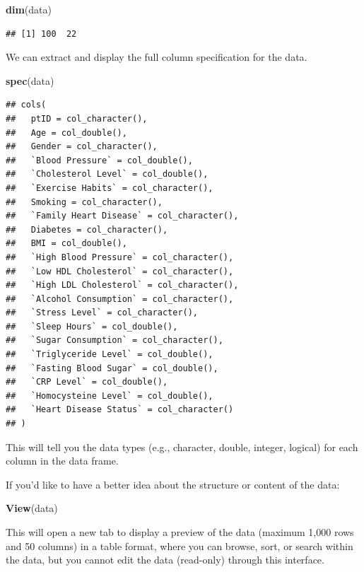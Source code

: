 \documentclass[
]{article}
\newenvironment{Shaded}{\begin{snugshade}}{\end{snugshade}}
\newcommand{\FunctionTok}[1]{\textcolor[rgb]{0.13,0.29,0.53}{\textbf{#1}}}
\newcommand{\NormalTok}[1]{#1}
\begin{document}
\begin{Shaded}
\begin{Highlighting}[]
\FunctionTok{dim}\NormalTok{(data)}
\end{Highlighting}
\end{Shaded}

\begin{verbatim}
## [1] 100  22
\end{verbatim}

We can extract and display the full column specification for the data.

\begin{Shaded}
\begin{Highlighting}[]
\FunctionTok{spec}\NormalTok{(data)}
\end{Highlighting}
\end{Shaded}

\begin{verbatim}
## cols(
##   ptID = col_character(),
##   Age = col_double(),
##   Gender = col_character(),
##   `Blood Pressure` = col_double(),
##   `Cholesterol Level` = col_double(),
##   `Exercise Habits` = col_character(),
##   Smoking = col_character(),
##   `Family Heart Disease` = col_character(),
##   Diabetes = col_character(),
##   BMI = col_double(),
##   `High Blood Pressure` = col_character(),
##   `Low HDL Cholesterol` = col_character(),
##   `High LDL Cholesterol` = col_character(),
##   `Alcohol Consumption` = col_character(),
##   `Stress Level` = col_character(),
##   `Sleep Hours` = col_double(),
##   `Sugar Consumption` = col_character(),
##   `Triglyceride Level` = col_double(),
##   `Fasting Blood Sugar` = col_double(),
##   `CRP Level` = col_double(),
##   `Homocysteine Level` = col_double(),
##   `Heart Disease Status` = col_character()
## )
\end{verbatim}

This will tell you the data types (e.g., character, double, integer,
logical) for each column in the data frame.

If you'd like to have a better idea about the structure or content of
the data:

\begin{Shaded}
\begin{Highlighting}[]
\FunctionTok{View}\NormalTok{(data)}
\end{Highlighting}
\end{Shaded}

This will open a new tab to display a preview of the data (maximum 1,000
rows and 50 columns) in a table format, where you can browse, sort, or
search within the data, but you cannot edit the data (read-only) through
this interface.
\end{document}
